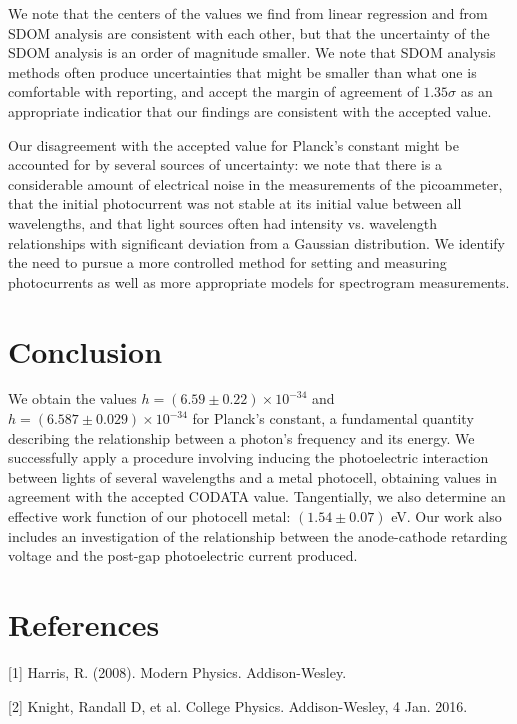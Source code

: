 \documentclass[11pt]{article}
\begin{document}
\vspace{1em}

We note that the centers of the values we find from linear regression and from
SDOM analysis are consistent with each other, but that the uncertainty of the
SDOM analysis is an order of magnitude smaller. We note that SDOM
analysis methods
often produce uncertainties that might be smaller than what one is
comfortable with
reporting, and accept the margin of agreement of $1.35\sigma$ as an appropriate
indicatior that our findings are consistent with the accepted value.

Our disagreement with the accepted value for Planck's constant might
be accounted for by
several sources of uncertainty: we note that there is a considerable amount
of electrical noise in the measurements of the picoammeter, that the initial
photocurrent was not stable at its initial value between all
wavelengths, and that
light sources often had intensity vs. wavelength relationships with significant
deviation from a Gaussian distribution. We identify the need to pursue a more
controlled method for setting and measuring photocurrents as well as
more appropriate models
for spectrogram measurements.


\section{Conclusion}

We obtain the values $h = (6.59 \pm 0.22) \times 10^{-34}$ and $h =
(6.587 \pm 0.029) \times 10^{-34}$ for Planck's constant, a fundamental quantity
describing the relationship between a photon's frequency and its
energy. We successfully
apply a procedure involving inducing the photoelectric interaction
between lights of several
wavelengths and a metal photocell, obtaining values in agreement with
the accepted CODATA value. Tangentially, we also determine an
effective work function
of our photocell metal: $(1.54 \pm 0.07)$ eV. Our work also includes
an investigation
of the relationship between the anode-cathode retarding voltage and
the post-gap photoelectric current produced.

\section{References}

[1] Harris, R. (2008). Modern Physics. Addison-Wesley.

\vspace{1em}

[2] Knight, Randall D, et al. College Physics. Addison-Wesley, 4 Jan. 2016.
\end{document}

